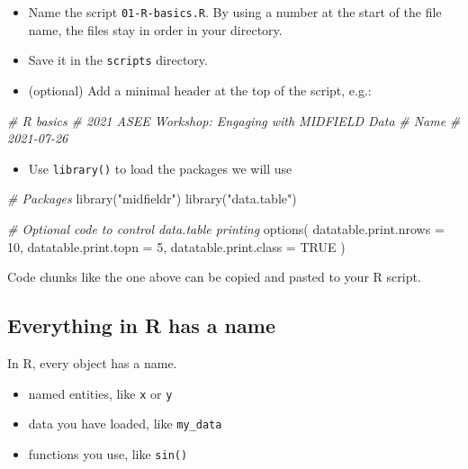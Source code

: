 \documentclass[
]{book}
\newenvironment{Shaded}{\begin{snugshade}}{\end{snugshade}}
\newcommand{\AttributeTok}[1]{\textcolor[rgb]{0.77,0.63,0.00}{#1}}
\newcommand{\CommentTok}[1]{\textcolor[rgb]{0.56,0.35,0.01}{\textit{#1}}}
\newcommand{\ConstantTok}[1]{\textcolor[rgb]{0.00,0.00,0.00}{#1}}
\newcommand{\DecValTok}[1]{\textcolor[rgb]{0.00,0.00,0.81}{#1}}
\newcommand{\FunctionTok}[1]{\textcolor[rgb]{0.00,0.00,0.00}{#1}}
\newcommand{\NormalTok}[1]{#1}
\newcommand{\StringTok}[1]{\textcolor[rgb]{0.31,0.60,0.02}{#1}}
\providecommand{\tightlist}{%
  \setlength{\itemsep}{0pt}\setlength{\parskip}{0pt}}
\begin{document}
\begin{itemize}
\tightlist
\item
  Name the script \texttt{01-R-basics.R}. By using a number at the start of the file name, the files stay in order in your directory.\\
\item
  Save it in the \texttt{scripts} directory.
\item
  (optional) Add a minimal header at the top of the script, e.g.:
\end{itemize}

\begin{Shaded}
\begin{Highlighting}[]
\CommentTok{\# R basics }
\CommentTok{\# 2021 ASEE Workshop: Engaging with MIDFIELD Data}
\CommentTok{\# Name }
\CommentTok{\# 2021{-}07{-}26}
\end{Highlighting}
\end{Shaded}

\begin{itemize}
\tightlist
\item
  Use \texttt{library()} to load the packages we will use
\end{itemize}

\begin{Shaded}
\begin{Highlighting}[]
\CommentTok{\# Packages}
\FunctionTok{library}\NormalTok{(}\StringTok{"midfieldr"}\NormalTok{)}
\FunctionTok{library}\NormalTok{(}\StringTok{"data.table"}\NormalTok{)}

\CommentTok{\# Optional code to control data.table printing}
\FunctionTok{options}\NormalTok{(}
  \AttributeTok{datatable.print.nrows =} \DecValTok{10}\NormalTok{,}
  \AttributeTok{datatable.print.topn =} \DecValTok{5}\NormalTok{,}
  \AttributeTok{datatable.print.class =} \ConstantTok{TRUE}
\NormalTok{)}
\end{Highlighting}
\end{Shaded}

Code chunks like the one above can be copied and pasted to your R script.

\hypertarget{everything-in-r-has-a-name}{%
\subsection{Everything in R has a name}\label{everything-in-r-has-a-name}}

In R, every object has a name.

\begin{itemize}
\tightlist
\item
  named entities, like \texttt{x} or \texttt{y}\\
\item
  data you have loaded, like \texttt{my\_data}
\item
  functions you use, like \texttt{sin()}
\end{itemize}
\end{document}
